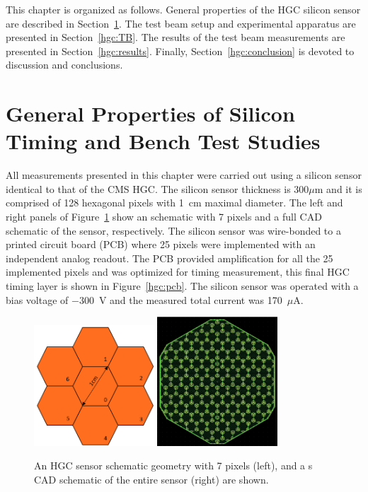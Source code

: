This chapter is organized as follows. General properties of the HGC
silicon sensor are described in Section~\ref{hgc:silicondet}. The test beam setup
and experimental apparatus are presented in Section~\ref{hgc:TB}. The results
of the test beam measurements are presented in Section~\ref{hgc:results}.
Finally, Section~\ref{hgc:conclusion} is devoted to discussion
and conclusions.

\section{General Properties of Silicon Timing and Bench Test Studies}
\label{hgc:silicondet}
All measurements presented in this chapter were carried out using a
silicon sensor identical to that of the CMS HGC. The silicon sensor
thickness is 300$\mu$m and it is comprised of 128
hexagonal pixels with 1~cm maximal diameter. The left and right panels
of Figure~\ref{hgc:cartoon} show an schematic with 7 pixels and a
full CAD schematic of the sensor, respectively. 
The silicon sensor was wire-bonded to a printed circuit board (PCB) where 25
pixels were implemented with an independent analog readout. The PCB
provided amplification for all the 25 implemented pixels and was
optimized for timing measurement, this final HGC timing layer is shown
in Figure~\ref{hgc:pcb}. The silicon sensor was operated with a bias
voltage of $-300$~V and the measured total current was 170~$\mu$A.
\begin{figure}[h] 
\centering
\includegraphics[width=0.4\textwidth]{HGC/HGC.PNG} 
\includegraphics[width=0.4\textwidth]{HGC/silicon_pixel.png} 
\caption{An HGC sensor schematic geometry with 7 pixels (left), and a
  s CAD schematic of the entire sensor (right) are shown.} 
\label{hgc:cartoon} 
\end{figure} 
